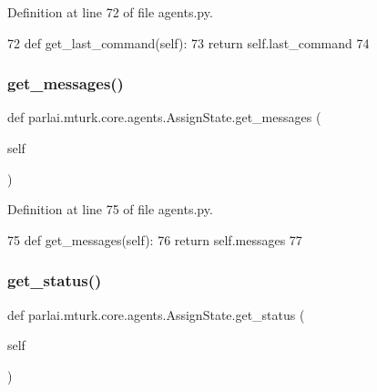 Definition at line 72 of file agents.\+py.


\begin{DoxyCode}
72     \textcolor{keyword}{def }get\_last\_command(self):
73         \textcolor{keywordflow}{return} self.last\_command
74 
\end{DoxyCode}
\mbox{\label{classparlai_1_1mturk_1_1core_1_1agents_1_1AssignState_a969247ece20ee74e12196bd5b5c448cc}} 
\subsubsection{\texorpdfstring{get\+\_\+messages()}{get\_messages()}}
{\footnotesize\ttfamily def parlai.\+mturk.\+core.\+agents.\+Assign\+State.\+get\+\_\+messages (\begin{DoxyParamCaption}\item[{}]{self }\end{DoxyParamCaption})}



Definition at line 75 of file agents.\+py.


\begin{DoxyCode}
75     \textcolor{keyword}{def }get\_messages(self):
76         \textcolor{keywordflow}{return} self.messages
77 
\end{DoxyCode}
\mbox{\label{classparlai_1_1mturk_1_1core_1_1agents_1_1AssignState_a14f5a0cbaf099fb25cfa284a502a8275}} 
\subsubsection{\texorpdfstring{get\+\_\+status()}{get\_status()}}
{\footnotesize\ttfamily def parlai.\+mturk.\+core.\+agents.\+Assign\+State.\+get\+\_\+status (\begin{DoxyParamCaption}\item[{}]{self }\end{DoxyParamCaption})}

